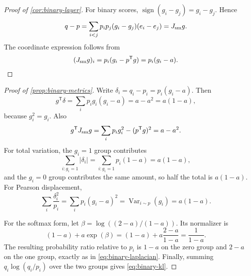 \documentclass[11pt]{article}
\theoremstyle{definition}
\theoremstyle{remark}
\DeclareMathOperator{\sign}{sign}
\DeclareMathOperator{\Var}{Var}
\newcommand{\trans}{\mathsf{T}}
\begin{document}
\begin{proof}[Proof of \cref{cor:binary-layer}]
For binary scores, $\sign(g_i-g_j)=g_i-g_j$. Hence
\begin{equation}
q-p=\sum_{i<j}p_i p_j(g_i-g_j)(e_i-e_j)
=J_{\rm sm}g.
\end{equation}
The coordinate expression follows from
\begin{equation}
(J_{\rm sm}g)_i=p_i(g_i-p^\trans g)=p_i(g_i-a).
\end{equation}
\end{proof}

\begin{proof}[Proof of \cref{prop:binary-metrics}]
Write $\delta_i=q_i-p_i=p_i(g_i-a)$. Then
\begin{equation}
g^\trans\delta
=\sum_i p_i g_i(g_i-a)=a-a^2=a(1-a),
\end{equation}
because $g_i^2=g_i$. Also
\begin{equation}
g^\trans J_{\rm sm}g
=\sum_i p_i g_i^2-(p^\trans g)^2=a-a^2.
\end{equation}
For total variation, the $g_i=1$ group contributes
\begin{equation}
\sum_{i:g_i=1}|\delta_i|=\sum_{i:g_i=1}p_i(1-a)=a(1-a),
\end{equation}
and the $g_i=0$ group contributes the same amount, so half the total is $a(1-a)$. For Pearson displacement,
\begin{equation}
\sum_i\frac{\delta_i^2}{p_i}
=\sum_i p_i(g_i-a)^2
=\Var_{i\sim p}(g_i)=a(1-a).
\end{equation}

For the softmax form, let $\beta=\log((2-a)/(1-a))$. Its normalizer is
\begin{equation}
(1-a)+a\exp(\beta)
=(1-a)+a\frac{2-a}{1-a}
=\frac{1}{1-a}.
\end{equation}
The resulting probability ratio relative to $p_i$ is $1-a$ on the zero group and $2-a$ on the one group, exactly as in \eqref{eq:binary-laplacian}. Finally, summing $q_i\log(q_i/p_i)$ over the two groups gives \eqref{eq:binary-kl}.
\end{proof}
\end{document}
